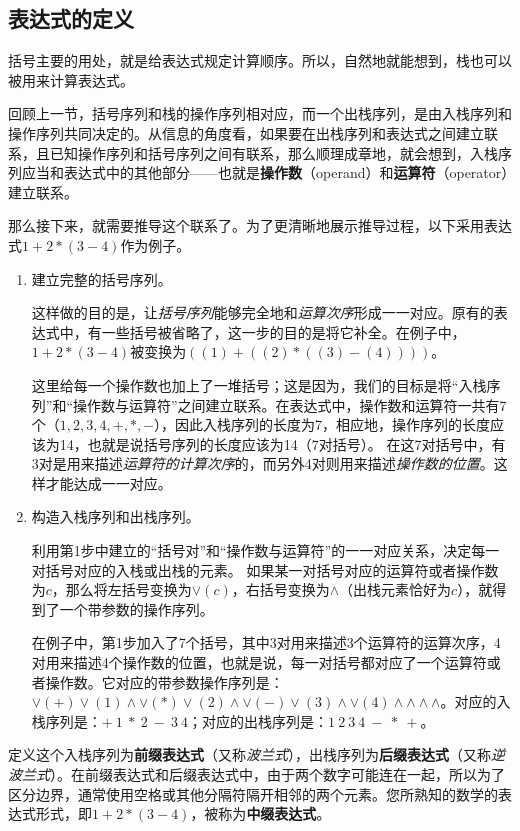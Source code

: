 \subsection{表达式的定义}
\label{stack:表达式}
括号主要的用处，就是给表达式规定计算顺序。所以，自然地就能想到，栈也可以被用来计算表达式。

回顾上一节，括号序列和栈的操作序列相对应，而一个出栈序列，是由入栈序列和操作序列共同决定的。从信息的角度看，如果要在出栈序列和表达式之间建立联系，且已知操作序列和括号序列之间有联系，那么顺理成章地，就会想到，入栈序列应当和表达式中的其他部分——也就是\textbf{操作数}（operand）和\textbf{运算符}（operator）建立联系。

那么接下来，就需要推导这个联系了。为了更清晰地展示推导过程，以下采用表达式$1+2*(3-4)$作为例子。

\begin{enumerate}
    \item 建立完整的括号序列。
    
    这样做的目的是，让\textit{括号序列}能够完全地和\textit{运算次序}形成一一对应。原有的表达式中，有一些括号被省略了，这一步的目的是将它补全。在例子中，$1 + 2 * ( 3 - 4 )$被变换为$((1)+((2)*((3)-(4))))$。
    
这里给每一个操作数也加上了一堆括号；这是因为，我们的目标是将“入栈序列”和“操作数与运算符”之间建立联系。在表达式中，操作数和运算符一共有7个（$1,2,3,4,+,*,-$），因此入栈序列的长度为7，相应地，操作序列的长度应该为14，也就是说括号序列的长度应该为14（7对括号）。
在这7对括号中，有3对是用来描述\textit{运算符的计算次序}的，而另外4对则用来描述\textit{操作数的位置}。这样才能达成一一对应。

    \item 构造入栈序列和出栈序列。

利用第1步中建立的“括号对”和“操作数与运算符”的一一对应关系，决定每一对括号对应的入栈或出栈的元素。
如果某一对括号对应的运算符或者操作数为$c$，那么将左括号变换为$\lor(c)$，右括号变换为$\land$（出栈元素恰好为$c$），就得到了一个带参数的操作序列。

在例子中，第1步加入了7个括号，其中3对用来描述3个运算符的运算次序，4对用来描述4个操作数的位置，也就是说，每一对括号都对应了一个运算符或者操作数。它对应的带参数操作序列是：$\lor(+) \lor(1)\land\lor(*) \lor(2) \land \lor(-) \lor(3) \land \lor(4) \land \land \land \land $。对应的入栈序列是：$+\ 1 \ *\ 2 \ - \ 3 \ 4$；对应的出栈序列是：$1 \ 2 \ 3 \ 4 \ - \ *\ +$。

\end{enumerate}


定义这个入栈序列为\textbf{前缀表达式}（又称\textit{波兰式}），出栈序列为\textbf{后缀表达式}（又称\textit{逆波兰式}）。在前缀表达式和后缀表达式中，由于两个数字可能连在一起，所以为了区分边界，通常使用空格或其他分隔符隔开相邻的两个元素。您所熟知的数学的表达式形式，即$1+2*(3-4)$，被称为\textbf{中缀表达式}。


